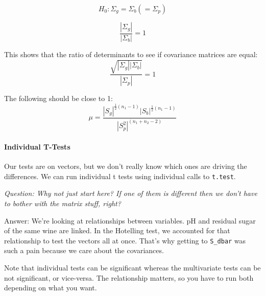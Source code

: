 \[H_0: \Sigma_g = \Sigma_b (= \Sigma_p)\]

\[\frac{| \Sigma_g |}{| \Sigma_b |} = 1\]

This shows that the ratio of determinants to see if covariance matrices
are equal: \[\frac{ \sqrt{|\Sigma_g||\Sigma_b| }}{|\Sigma_p|} = 1\]

The following should be close to 1:
\[\mu = \frac{|S_g|^{\frac{1}{2}(n_1 - 1)}|S_b|^{\frac{1}{2}(n_1 - 1)}}{|S_p^2|^{(n_1 + n_2 - 2)}}\]

\hypertarget{individual-t-tests}{%
\paragraph{Individual T-Tests}\label{individual-t-tests}}

Our tests are on vectors, but we don't really know which ones are
driving the differences. We can run individual t tests using individual
calls to \texttt{t.test}.

\emph{Question: Why not just start here? If one of them is different
then we don't have to bother with the matrix stuff, right?}

Answer: We're looking at relationships between variables. pH and
residual sugar of the same wine are linked. In the Hotelling test, we
accounted for that relationship to test the vectors all at once. That's
why getting to \texttt{S\_dbar} was such a pain because we care about
the covariances.

Note that individual tests can be significant whereas the multivariate
tests can be not significant, or vice-versa. The relationship matters,
so you have to run both depending on what you want.
